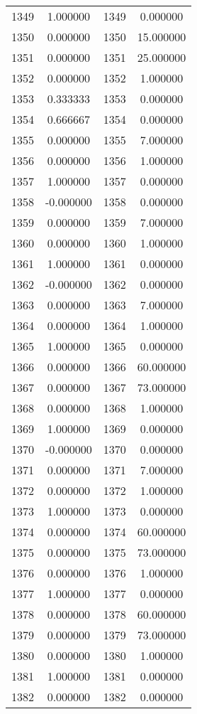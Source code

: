 \documentclass[12pt]{article}
\begin{document}
\begin{longtable}{@{}cccc@{}}
1349 & 1.000000 & 1349 & 0.000000 \\
1350 & 0.000000 & 1350 & 15.000000 \\
1351 & 0.000000 & 1351 & 25.000000 \\
1352 & 0.000000 & 1352 & 1.000000 \\
1353 & 0.333333 & 1353 & 0.000000 \\
1354 & 0.666667 & 1354 & 0.000000 \\
1355 & 0.000000 & 1355 & 7.000000 \\
1356 & 0.000000 & 1356 & 1.000000 \\
1357 & 1.000000 & 1357 & 0.000000 \\
1358 & -0.000000 & 1358 & 0.000000 \\
1359 & 0.000000 & 1359 & 7.000000 \\
1360 & 0.000000 & 1360 & 1.000000 \\
1361 & 1.000000 & 1361 & 0.000000 \\
1362 & -0.000000 & 1362 & 0.000000 \\
1363 & 0.000000 & 1363 & 7.000000 \\
1364 & 0.000000 & 1364 & 1.000000 \\
1365 & 1.000000 & 1365 & 0.000000 \\
1366 & 0.000000 & 1366 & 60.000000 \\
1367 & 0.000000 & 1367 & 73.000000 \\
1368 & 0.000000 & 1368 & 1.000000 \\
1369 & 1.000000 & 1369 & 0.000000 \\
1370 & -0.000000 & 1370 & 0.000000 \\
1371 & 0.000000 & 1371 & 7.000000 \\
1372 & 0.000000 & 1372 & 1.000000 \\
1373 & 1.000000 & 1373 & 0.000000 \\
1374 & 0.000000 & 1374 & 60.000000 \\
1375 & 0.000000 & 1375 & 73.000000 \\
1376 & 0.000000 & 1376 & 1.000000 \\
1377 & 1.000000 & 1377 & 0.000000 \\
1378 & 0.000000 & 1378 & 60.000000 \\
1379 & 0.000000 & 1379 & 73.000000 \\
1380 & 0.000000 & 1380 & 1.000000 \\
1381 & 1.000000 & 1381 & 0.000000 \\
1382 & 0.000000 & 1382 & 0.000000 \\

\end{longtable}
\end{document}

